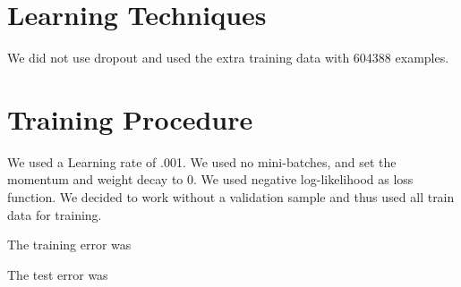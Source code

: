 \documentclass[10pt,letterpaper]{article}
\begin{document}
\section{Learning Techniques}\label{learning-techniques}


We did not use dropout and used the extra training data with 604388
examples.

\section{Training Procedure}\label{training-procedure}



We used a Learning rate of .001. We used no mini-batches, and set the
momentum and weight decay to 0. We used negative log-likelihood as loss
function. We decided to work without a validation sample and thus used
all train data for training.

The training error was

The test error was
\end{document}
